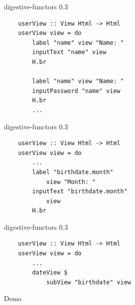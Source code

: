 \documentclass[20pt]{beamer}
\begin{document}
\begin{frame}[fragile]{digestive-functors 0.3}
    \begin{lstlisting}
    userView :: View Html -> Html
    userView view = do
        label "name" view "Name: "
        inputText "name" view
        H.br

        label "name" view "Name: "
        inputPassword "name" view
        H.br
        ...
    \end{lstlisting}
\end{frame}

\begin{frame}[fragile]{digestive-functors 0.3}
    \begin{lstlisting}
    userView :: View Html -> Html
    userView view = do
        ...
        label "birthdate.month"
            view "Month: "
        inputText "birthdate.month"
            view
        H.br
    \end{lstlisting}
\end{frame}

\begin{frame}[fragile]{digestive-functors 0.3}
    \begin{lstlisting}
    userView :: View Html -> Html
    userView view = do
        ...
        dateView $
            subView "birthdate" view
    \end{lstlisting}
\end{frame}

\begin{frame}[plain]
    \begin{center}
    \huge{Demo}
    \end{center}
\end{frame}
\end{document}
